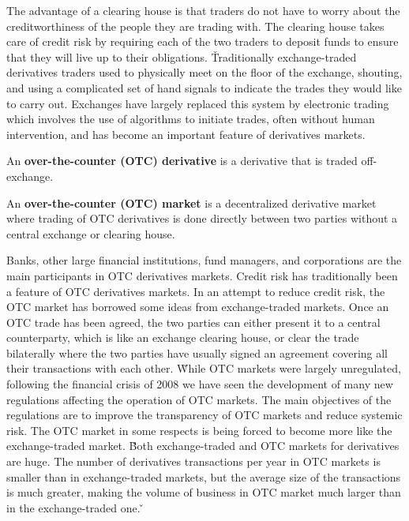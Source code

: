 The advantage of a clearing house is that traders do not have to worry about the creditworthiness of the people they
are trading with. The clearing house takes care of credit risk by requiring each of the two traders to deposit funds
to ensure that they will live up to their obligations. \v

Traditionally exchange-traded derivatives traders used to physically meet on the floor of the exchange, shouting, and
using a complicated set of hand signals to indicate the trades they would like to carry out. Exchanges have largely
replaced this system by electronic trading which involves the use of algorithms to initiate trades, often without human
intervention, and has become an important feature of derivatives markets.

An \textbf{over-the-counter (OTC) derivative} is a derivative that is traded off-exchange.
\ed

An \textbf{over-the-counter (OTC) market} is a decentralized derivative market where trading of OTC derivatives is done
directly between two parties without a central exchange or clearing house.
\ed

Banks, other large financial institutions, fund managers, and corporations are the main participants in OTC derivatives
markets. Credit risk has traditionally been a feature of OTC derivatives markets. In an attempt to reduce credit risk,
the OTC market has borrowed some ideas from exchange-traded markets. Once an OTC trade has been agreed, the two parties
can either present it to a central counterparty, which is like an exchange clearing house, or clear the trade
bilaterally where the two parties have usually signed an agreement covering all their transactions with each other. \v

While OTC markets were largely unregulated, following the financial crisis of 2008 we have seen the development of
many new regulations affecting the operation of OTC markets. The main objectives of the regulations are to improve
the transparency of OTC markets and reduce systemic risk. The OTC market in some respects is being forced to become
more like the exchange-traded market. \v

Both exchange-traded and OTC markets for derivatives are huge. The number of derivatives transactions per year in OTC
markets is smaller than in exchange-traded markets, but the average size of the transactions is much greater, making
the volume of business in OTC market much larger than in the exchange-traded one. \v

